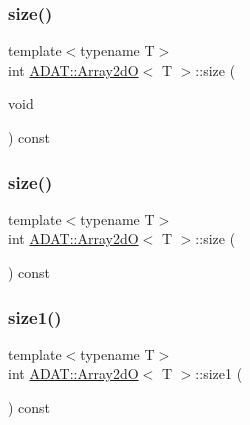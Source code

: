 \mbox{\label{classADAT_1_1Array2dO_a2f8311cdee5283e57e5d13887a463123}} 
\subsubsection{\texorpdfstring{size()}{size()}\hspace{0.1cm}{\footnotesize\ttfamily [2/3]}}
{\footnotesize\ttfamily template$<$typename T$>$ \\
int \mbox{\hyperlink{classADAT_1_1Array2dO}{A\+D\+A\+T\+::\+Array2dO}}$<$ T $>$\+::size (\begin{DoxyParamCaption}\item[{void}]{ }\end{DoxyParamCaption}) const\hspace{0.3cm}{\ttfamily [inline]}}

\mbox{\label{classADAT_1_1Array2dO_a2f8311cdee5283e57e5d13887a463123}} 
\subsubsection{\texorpdfstring{size()}{size()}\hspace{0.1cm}{\footnotesize\ttfamily [3/3]}}
{\footnotesize\ttfamily template$<$typename T$>$ \\
int \mbox{\hyperlink{classADAT_1_1Array2dO}{A\+D\+A\+T\+::\+Array2dO}}$<$ T $>$\+::size (\begin{DoxyParamCaption}{ }\end{DoxyParamCaption}) const\hspace{0.3cm}{\ttfamily [inline]}}

\mbox{\label{classADAT_1_1Array2dO_a8713bf273adbc5e2313e1afd8f88fe7c}} 
\subsubsection{\texorpdfstring{size1()}{size1()}\hspace{0.1cm}{\footnotesize\ttfamily [1/3]}}
{\footnotesize\ttfamily template$<$typename T$>$ \\
int \mbox{\hyperlink{classADAT_1_1Array2dO}{A\+D\+A\+T\+::\+Array2dO}}$<$ T $>$\+::size1 (\begin{DoxyParamCaption}{ }\end{DoxyParamCaption}) const\hspace{0.3cm}{\ttfamily [inline]}}

